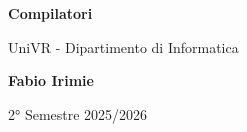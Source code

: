 \begin{titlepage}
	\begin{center}
		\vspace*{1cm}

		\Huge
		\textbf{Compilatori}

		\vspace{0.5cm}
		\LARGE
		UniVR - Dipartimento di Informatica

		\vspace{1.5cm}

		\textbf{Fabio Irimie}

		\vfill


		\vspace{0.8cm}


		2° Semestre 2025/2026

	\end{center}
\end{titlepage}
